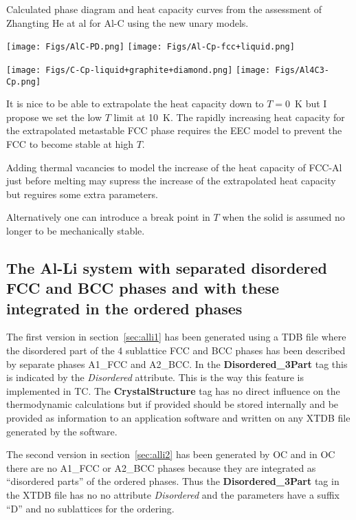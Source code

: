 \documentclass{article}
\begin{document}
\begin{appendices}
\newpage

Calculated phase diagram and heat capacity curves from the assessment
of Zhangting He at al for Al-C using the new unary models.

\texttt{[image: Figs/AlC-PD.png]}
\texttt{[image: Figs/Al-Cp-fcc+liquid.png]}

\texttt{[image: Figs/C-Cp-liquid+graphite+diamond.png]}
\texttt{[image: Figs/Al4C3-Cp.png]}

It is nice to be able to extrapolate the heat capacity down to $T=0$~K
but I propose we set the low $T$ limit at 10~K.  The rapidly
increasing heat capacity for the extrapolated metastable FCC phase
requires the EEC model to prevent the FCC to become stable at high $T$.

Adding thermal vacancies to model the increase of the heat capacity of
FCC-Al just before melting may supress the increase of the
extrapolated heat capacity but reguires some extra parameters.

Alternatively one can introduce a break point in $T$ when the solid is
assumed no longer to be mechanically stable.

\newpage

\subsection{The Al-Li system with separated disordered FCC and BCC phases
  and with these integrated in the ordered phases}

The first version in section~\ref{sec:alli1} has been generated using
a TDB file where the disordered part of the 4 sublattice FCC and BCC
phases has been described by separate phases A1\_FCC and A2\_BCC.  In
the {\bf Disordered\_3Part} tag this is indicated by the {\em Disordered}
attribute.  This is the way this feature is implemented in TC.  The
{\bf CrystalStructure} tag has no direct influence on the
thermodynamic calculations but if provided should be stored internally
and be provided as information to an application software and written
on any XTDB file generated by the software.

The second version in section~\ref{sec:alli2} has been generated by OC
and in OC there are no A1\_FCC or A2\_BCC phases because they are
integrated as ``disordered parts'' of the ordered phases.  Thus the
{\bf Disordered\_3Part} tag in the XTDB file has no no attribute {\em
  Disordered} and the parameters have a suffix ``D'' and no
sublattices for the ordering.


\end{appendices}
\end{document}
